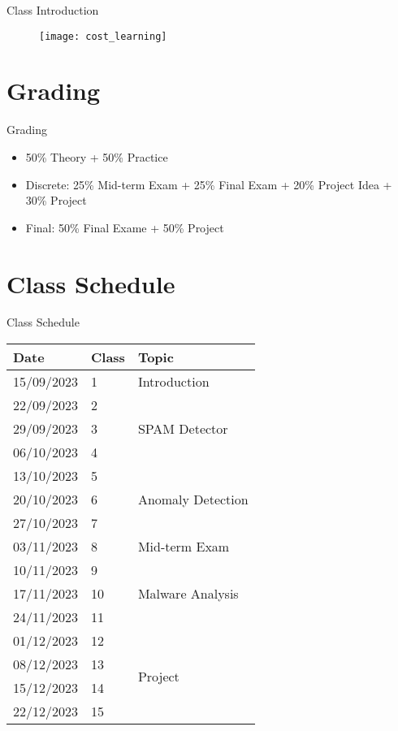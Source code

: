 \documentclass[hyperref={hidelinks}]{beamer}
\begin{document}
  \begin{frame}{Class Introduction}
    \begin{figure}
    \centering
    \texttt{[image: cost\_learning]}
    \end{figure}
  \end{frame}

  \section{Grading}
  \begin{frame}[allowframebreaks]{Grading}
    \begin{itemize}
      \item 50\% Theory + 50\% Practice 
      \item Discrete: 25\% Mid-term Exam + 25\% Final Exam + 20\% Project Idea + 30\% Project
      \item Final: 50\% Final Exame + 50\% Project 
    \end{itemize}
  \end{frame}

  \section{Class Schedule}
  \begin{frame}[allowframebreaks]{Class Schedule}
    \begin{table}[!ht]
      \footnotesize
      \centering
      \begin{tabular}{lll}
      \toprule
          Date & Class & Topic \\ \midrule
          15/09/2023 & 1 & Introduction \\ 
          22/09/2023 & 2 & \multirow{3}{*}{SPAM Detector} \\ 
          29/09/2023 & 3 \\ 
          06/10/2023 & 4 \\ 
          13/10/2023 & 5 & \multirow{3}{*}{Anomaly Detection} \\ 
          20/10/2023 & 6 \\ 
          27/10/2023 & 7 \\ 
          03/11/2023 & 8 & Mid-term Exam \\ 
          10/11/2023 & 9 & \multirow{3}{*}{Malware Analysis} \\ 
          17/11/2023 & 10 \\ 
          24/11/2023 & 11 \\ 
          01/12/2023 & 12 & \multirow{4}{*}{Project} \\ 
          08/12/2023 & 13 \\ 
          15/12/2023 & 14 \\ 
          22/12/2023 & 15 \\ \bottomrule
      \end{tabular}
  \end{table}  
  \end{frame}
\end{document}
